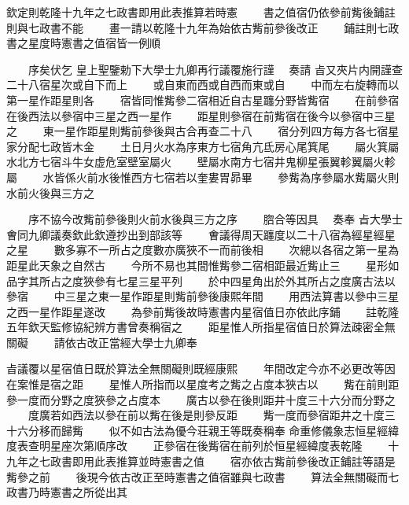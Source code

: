 \begin{正文}
欽定則乾隆十九年之七政書即用此表推算若時憲
　　書之值宿仍依參前觜後鋪註則與七政書不能
　　畫一請以乾隆十九年為始依古觜前參後改正
　　鋪註則七政書之星度時憲書之值宿皆一例順
\par
　　序矣伏乞
皇上聖鑒勅下大學士九卿再行議覆施行謹
　奏請
㫖又夾片内開謹查二十八宿星次或自下而上
　　或自東而西或自西而東或自
　　中而左右旋轉而以第一星作距星則各
　　宿皆同惟觜參二宿相近自古星躔分野皆觜宿
　　在前參宿在後西法以參宿中三星之西一星作
　　距星則參宿在前觜宿在後今以參宿中三星之
　　東一星作距星則觜前參後與古合再查二十八
　　宿分列四方每方各七宿星家分配七政皆木金
　　土日月火水為序東方七宿角亢氐房心尾箕尾
　　屬火箕屬水北方七宿斗牛女虚危室壁室屬火
　　壁屬水南方七宿井鬼柳星張翼軫翼屬火軫屬
　　水皆係火前水後惟西方七宿若以奎婁胃昴畢
　　參觜為序參屬水觜屬火則水前火後與三方之
\par
　　序不協今改觜前參後則火前水後與三方之序
　　脗合等因具
　奏奉
㫖大學士㑹同九卿議奏欽此欽遵抄出到部該等
　　㑹議得周天躔度以二十八宿為經星經星之星
　　數多寡不一所占之度數亦廣狹不一而前後相
　　次總以各宿之第一星為距星此天象之自然古
　　今所不易也其間惟觜參二宿相距最近觜止三
　　星形如品字其所占之度狹參有七星三星平列
　　於中四星角出於外其所占之度廣古法以參宿
　　中三星之東一星作距星則觜前參後康熙年間
　　用西法算書以參中三星之西一星作距星遂改
　　為參前觜後故時憲書内星宿值日亦依此序鋪
　　註乾隆五年欽天監修協紀辨方書曾奏稱宿之
　　距星惟人所指星宿值日於算法疎密全無關礙
　　請依古改正當經大學士九卿奉
\par
㫖議覆以星宿值日既於算法全無關礙則既經康熙
　　年間改定今亦不必更改等因在案惟是宿之距
　　星惟人所指而以星度考之觜之占度本狹古以
　　觜在前則距參一度而分野之度狹參之占度本
　　廣古以參在後則距井十度三十六分而分野之
　　度廣若如西法以參在前以觜在後是則參反距
　　觜一度而參宿距井之十度三十六分移而歸觜
　　似不如古法為優今荘親王等既奏稱奉
命重修儀象志恒星經緯度表查明星座次第順序改
　　正參宿在後觜宿在前列於恒星經緯度表乾隆
　　十九年之七政書即用此表推算並時憲書之值
　　宿亦依古觜前參後改正鋪註等語是觜參之前
　　後現今依古改正至時憲書之值宿雖與七政書
　　算法全無關礙而七政書乃時憲書之所從出其

\end{正文}
